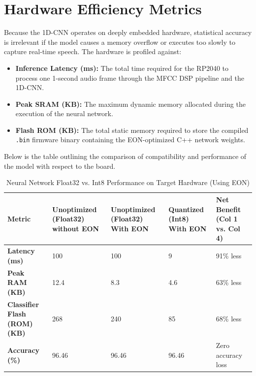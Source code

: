\documentclass[11pt,a4paper,openany]{book}
\begin{document}
\section{Hardware Efficiency Metrics}
Because the 1D-CNN operates on deeply embedded hardware, statistical accuracy is irrelevant if the model causes a memory overflow or executes too slowly to capture real-time speech. The hardware is profiled against:

\begin{itemize}
    \item \textbf{Inference Latency (ms):} The total time required for the RP2040 to process one 1-second audio frame through the MFCC DSP pipeline and the 1D-CNN.
    \item \textbf{Peak SRAM (KB):} The maximum dynamic memory allocated during the execution of the neural network.
    \item \textbf{Flash ROM (KB):} The total static memory required to store the compiled \texttt{.bin} firmware binary containing the EON-optimized C++ network weights.
\end{itemize}

Below is the table outlining the comparison of compatibility and performance of the model with respect to the board.

\vspace{1em}

\begin{table}[!ht]
\centering
\caption{Neural Network Float32 vs. Int8 Performance on Target Hardware (Using EON\texttrademark{})}
\label{tab:float_vs_int}
\renewcommand{\arraystretch}{1.4}
\begin{tabular}{|p{3cm}|p{2.5cm}|p{2.5cm}|p{2cm}|p{2.5cm}|}
\hline
\textbf{Metric} & \textbf{Unoptimized (Float32) without EON} & \textbf{Unoptimized (Float32) With EON} & \textbf{Quantized (Int8) With EON} & \textbf{Net Benefit \newline (Col 1 vs. Col 4)} \\ \hline
\textbf{Latency (ms)} & 100 & 100 & 9 & 91\% less \\ \hline
\textbf{Peak RAM (KB)} & 12.4 & 8.3 & 4.6 & 63\% less \\ \hline
\textbf{Classifier Flash (ROM) (KB)} & 268 & 240 & 85 & 68\% less \\ \hline
\textbf{Accuracy (\%)} & 96.46 & 96.46 & 96.46 & Zero accuracy loss \\ \hline
\end{tabular}
\end{table}
\end{document}
